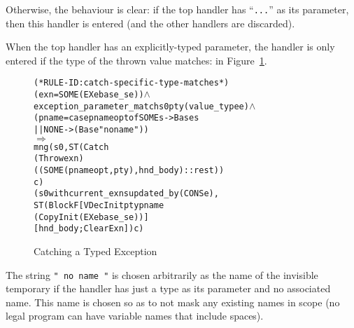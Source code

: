 \documentclass[11pt]{article}
\begin{document}
Otherwise, the behaviour is clear: if the top handler has
``\texttt{...}'' as its parameter, then this handler is entered (and
the other handlers are discarded).

When the top handler has an explicitly-typed parameter, the handler is
only entered if the type of the thrown value matches:
 in
Figure~\ref{fig:catch-specific-type-matches}.
\begin{figure}[htbp]
\begin{center}
\begin{minipage}{\textwidth}
%
\begin{alltt}
(* RULE-ID: catch-specific-type-matches *)
     (exn = SOME (EX e base_se)) \(\land\)
     exception_parameter_match s0 pty (value_type e) \(\land\)
     (pname = case pnameopt of SOME s -> Base s
                            || NONE -> (Base " no name "))
   \(\Rightarrow\)
     mng (s0, ST (Catch
                   (Throw exn)
                   ((SOME(pnameopt, pty), hnd_body) :: rest))
                 c)
         (s0 with current_exns updated_by (CONS e),
          ST (Block F [VDecInit pty pname
                                    (CopyInit (EX e base_se))]
                      [hnd_body; ClearExn]) c)
\end{alltt}
\end{minipage}
\end{center}
\caption{Catching a Typed Exception}
\label{fig:catch-specific-type-matches}
\end{figure}

The string \texttt{" no name "} is chosen arbitrarily as the name of
the invisible temporary if the handler has just a type as its
parameter and no associated name.  This name is chosen so as to not
mask any existing names in scope (no legal \cpp{} program can have
variable names that include spaces).
\end{document}
